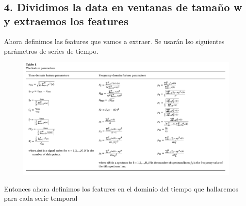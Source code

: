 \documentclass[11pt]{article}
\makeatletter
\def\maxwidth{\ifdim\Gin@nat@width>\linewidth\linewidth
    \else\Gin@nat@width\fi}
\let\Oldincludegraphics\includegraphics
\renewcommand{\includegraphics}[1]{\Oldincludegraphics[width=.9\maxwidth]{#1}}
\makeatother
\begin{document}
    \begin{center}
    \end{center}
    { \hspace*{\fill} \\}

    \subsection{4. Dividimos la data en ventanas de tamaño w y extraemos los
features}\label{dividimos-la-data-en-ventanas-de-tamauxf1o-w-y-extraemos-los-features}

    Ahora definimos las features que vamos a extraer. Se usarán lso
siguientes parámetros de series de tiempo.

\begin{figure}[htbp]
\centering
\includegraphics{attachment:image.png}
\end{figure}

    Entonces ahora definimos los features en el dominio del tiempo que
hallaremos para cada serie temporal
\end{document}
